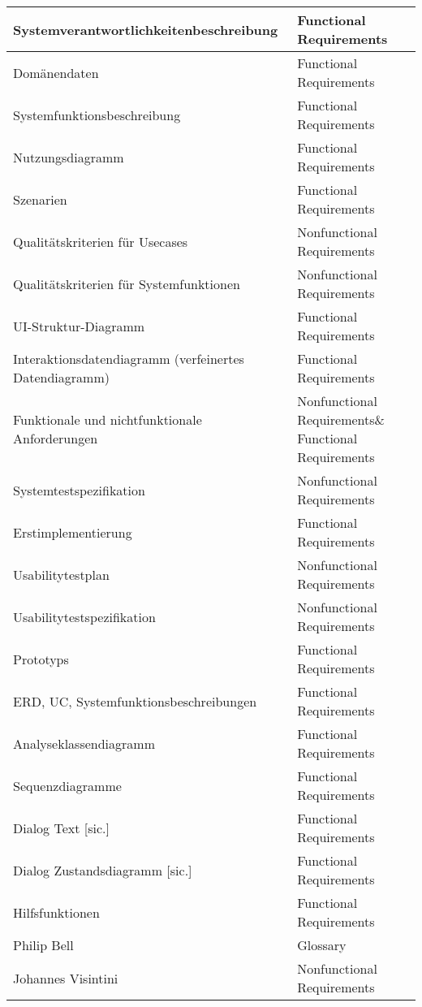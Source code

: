 \documentclass[ngerman]{scrartcl}
\newcommand{\f}{Functional Requirements}
\newcommand{\n}{Nonfunctional Requirements}
\newcommand{\g}{Glossary}
\begin{document}
\begin{tiny}
\begin{longtable}{|l|l|}
		\hline
		Systemverantwortlichkeitenbeschreibung & \f\\
		\hline
		Domänendaten & \f\\
		\hline
		Systemfunktionsbeschreibung & \f\\
		\hline
		Nutzungsdiagramm & \f\\
		\hline
		Szenarien & \f\\
		\hline
		Qualitätskriterien für Usecases & \n\\
		\hline
		Qualitätskriterien für Systemfunktionen & \n\\
		\hline
		UI-Struktur-Diagramm & \f\\
		\hline
		Interaktionsdatendiagramm (verfeinertes Datendiagramm)& \f\\
		\hline
		Funktionale und nichtfunktionale Anforderungen & \n \& \f\\
		\hline
		Systemtestspezifikation & \n\\
		\hline
		Erstimplementierung & \f\\
		\hline
		Usabilitytestplan & \n\\
		\hline
		Usabilitytestspezifikation & \n\\
		\hline
		Prototyps & \f\\
		\hline
		ERD, UC, Systemfunktionsbeschreibungen & \f\\
		\hline
		Analyseklassendiagramm & \f\\
		\hline
		Sequenzdiagramme & \f\\
		\hline
		Dialog Text [sic.] & \f\\
		\hline
		Dialog Zustandsdiagramm [sic.] & \f\\
		\hline
		Hilfsfunktionen & \f\\
		\hline
		Philip Bell & \g\\
		\hline
		Johannes Visintini & \n\\
		\hline
	\end{longtable}
	\end{tiny}
\end{document}
